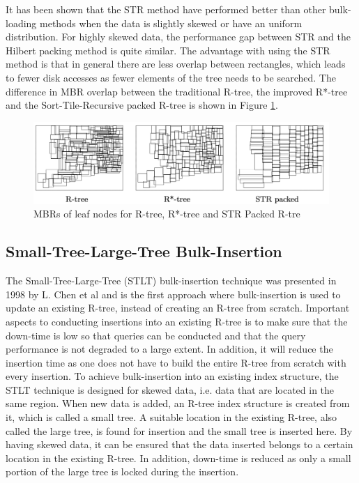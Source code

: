 \noindent
It has been shown that the STR method have performed better than other bulk-loading methods when the data is slightly skewed or have an uniform distribution. For highly skewed data, the performance gap between STR and the Hilbert packing method is quite similar\cite{STR}. The advantage with using the STR method is that in general there are less overlap between rectangles, which leads to fewer disk accesses as fewer elements of the tree needs to be searched. The difference in MBR overlap between the traditional R-tree, the improved R*-tree and the Sort-Tile-Recursive packed R-tree is shown in Figure \ref{fig:STRTree}.

\begin{figure}[ht]
    \centering
    \includegraphics[scale=0.7]{figures/STR.png}
    \caption{MBRs of leaf nodes for R-tree, R*-tree and STR Packed R-tre\cite{RTreesTheoryApplications}}
    \label{fig:STRTree}
\end{figure}

\subsection{Small-Tree-Large-Tree Bulk-Insertion}
The Small-Tree-Large-Tree (STLT) bulk-insertion technique was presented in 1998 by L. Chen et al\cite{STLT} and is the first approach where bulk-insertion is used to update an existing R-tree, instead of creating an R-tree from scratch. Important aspects to conducting insertions into an existing R-tree is to make sure that the down-time is low so that queries can be conducted and that the query performance is not degraded to a large extent. In addition, it will reduce the insertion time as one does not have to build the entire R-tree from scratch with every insertion. To achieve bulk-insertion into an existing index structure, the STLT technique is designed for skewed data, i.e. data that are located in the same region. When new data is added, an R-tree index structure is created from it, which is called a small tree. A suitable location in the existing R-tree, also called the large tree, is found for insertion and the small tree is inserted here. By having skewed data, it can be ensured that the data inserted belongs to a certain location in the existing R-tree. In addition, down-time is reduced as only a small portion of the large tree is locked during the insertion.\newline

